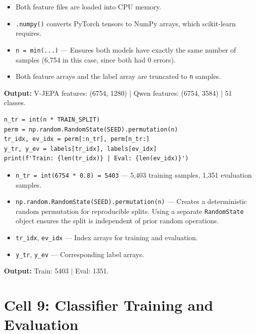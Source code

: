 \begin{explanation}
\begin{itemize}[nosep]
  \item Both feature files are loaded into CPU memory.
  \item \texttt{.numpy()} converts PyTorch tensors to NumPy arrays, which scikit-learn requires.
  \item \texttt{n = min(...)} --- Ensures both models have exactly the same number of samples (6,754 in this case, since both had 0 errors).
  \item Both feature arrays and the label array are truncated to \texttt{n} samples.
\end{itemize}
\textbf{Output:} V-JEPA features: (6754, 1280) | Qwen features: (6754, 3584) | 51 classes.
\end{explanation}

\begin{lstlisting}
n_tr = int(n * TRAIN_SPLIT)
perm = np.random.RandomState(SEED).permutation(n)
tr_idx, ev_idx = perm[:n_tr], perm[n_tr:]
y_tr, y_ev = labels[tr_idx], labels[ev_idx]
print(f'Train: {len(tr_idx)} | Eval: {len(ev_idx)}')
\end{lstlisting}

\begin{explanation}
\begin{itemize}[nosep]
  \item \texttt{n\_tr = int(6754 * 0.8) = 5403} --- 5,403 training samples, 1,351 evaluation samples.
  \item \texttt{np.random.RandomState(SEED).permutation(n)} --- Creates a deterministic random permutation for reproducible splits. Using a separate \texttt{RandomState} object ensures the split is independent of prior random operations.
  \item \texttt{tr\_idx}, \texttt{ev\_idx} --- Index arrays for training and evaluation.
  \item \texttt{y\_tr}, \texttt{y\_ev} --- Corresponding label arrays.
\end{itemize}
\textbf{Output:} Train: 5403 | Eval: 1351.
\end{explanation}

\newpage
\section{Cell 9: Classifier Training and Evaluation}

